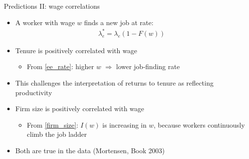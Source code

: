 \documentclass[9pt]{beamer}
\newcommand{\bit}{\begin{itemize}}
\newcommand{\eit}{\end{itemize}}
\newcommand{\lb}{\label}
\begin{document}
\begin{frame}{Predictions II: wage correlations}

\bit
\setlength\itemsep{2em}

\item A worker with wage $w$ finds a new job at rate:
\begin{eqnarray}
\lb{ee_rate}
\lambda_e^* = \lambda_e(1-F(w))
\end{eqnarray}

\item Tenure is positively correlated with wage
\bit
	\item From \eqref{ee_rate}: higher $w$ $\Rightarrow$ lower job-finding rate
\eit


\item This challenges the interpretation of returns to tenure as reflecting productivity

\item Firm size is positively correlated with wage
\bit
	\item From \eqref{firm_size}: $I(w)$ is increasing in $w$, because workers continuously climb the job ladder
\eit

\item Both are true in the data (Mortensen, Book 2003)
%


\eit


\end{frame}
\end{document}
